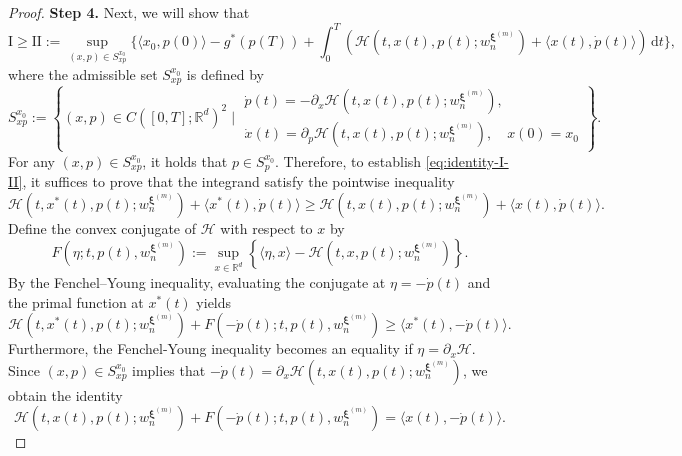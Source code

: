\documentclass[11pt]{article}
\numberwithin{equation}{section}
\theoremstyle{plain}
\theoremstyle{definition}
\theoremstyle{remark}
\newcommand{\R}{\mathbb{R}}
\newcommand{\dd}{\mathrm{d}}
\begin{document}
\begin{proof}
{\bf Step 4.} Next, we will show that 
\begin{equation} \label{eq:identity-I-II}
    \textrm{I} \ge \textrm{II} := \sup_{(x,p)\in S_{xp}^{x_0}} \bigg\{\langle x_0, p(0) \rangle - g^*(p(T)) + \int_0^T \left(\mathcal{H}(t,x(t), p(t); w_n^{\bm{\xi}^{(m)}}) + \langle x(t), \dot{p}(t) \rangle\right) \,\dd t \bigg\}, 
\end{equation}
where the admissible set $S_{xp}^{x_0}$ is defined by 
\begin{equation*}
    S_{xp}^{x_0} := \left\{
(x,p)\in C([0,T]; \mathbb{R}^d)^2 \;\bigg|\;
\begin{array}{l}\dot{p}(t) = -\partial_x \mathcal{H}(t,x(t), p(t); w_n^{\bm{\xi}^{(m)}}), \\
\dot{x}(t) = \partial_p\mathcal{H}(t,x(t), p(t); w_n^{\bm{\xi}^{(m)}}),\quad x(0) = x_0
\end{array}\right\}. 
\end{equation*}
For any $(x, p) \in S_{xp}^{x_0}$, it holds that $p\in S_p^{x_0}$. Therefore, to establish \eqref{eq:identity-I-II}, it suffices to prove that the integrand satisfy the pointwise inequality 
\begin{equation} \label{eq:goal-ineq}
    \mathcal{H}(t, x^*(t), p(t); w_n^{\bm{\xi}^{(m)}}) + \langle x^*(t), \dot{p}(t)\rangle \ge \mathcal{H}(t,x(t), p(t); w_n^{\bm{\xi}^{(m)}}) + \langle x(t), \dot{p}(t) \rangle. 
\end{equation}
Define the convex conjugate of $\mathcal{H}$ with respect to $x$ by 
\begin{equation*}
    F(\eta; t, p(t), w_n^{\bm{\xi}^{(m)}}) := \sup_{x\in \R^d} \left\{ \langle \eta, x\rangle - \mathcal{H}(t, x, p(t); w_n^{\bm{\xi}^{(m)}}) \right\}. 
\end{equation*}
By the Fenchel–Young inequality, evaluating the conjugate at $\eta = -\dot{p}(t)$ and the primal function at $x^*(t)$ yields 
\begin{equation} \label{eq:FY-1}
    \mathcal{H}(t, x^*(t), p(t); w_n^{\bm{\xi}^{(m)}}) + F(-\dot{p}(t); t, p(t), w_n^{\bm{\xi}^{(m)}}) \ge \langle x^*(t), -\dot{p}(t)\rangle. 
\end{equation}
Furthermore, the Fenchel-Young inequality becomes an equality if $\eta = \partial_x\mathcal{H}$. Since $(x, p) \in S_{xp}^{x_0}$ implies that $-\dot{p}(t) = \partial_x\mathcal{H}(t, x(t), p(t); w_n^{\bm{\xi}^{(m)}})$, we obtain the identity 
\begin{equation} \label{eq:FY-2}
    \mathcal{H}(t, x(t), p(t); w_n^{\bm{\xi}^{(m)}}) + F(-\dot{p}(t); t, p(t), w_n^{\bm{\xi}^{(m)}}) = \langle x(t), -\dot{p}(t)\rangle. 

\end{equation}
\end{proof}
\end{document}
